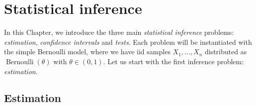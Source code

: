 \documentclass[
	fontsize=11pt, %
	twoside=false, %
	numbers=noenddot, %
]{kaobook}
\DeclareMathOperator{\ber}{Bernoulli}
\begin{document}
\mainmatter %




% 



\setchapterpreamble[u]{\margintoc}
\chapter{Statistical inference}
\label{chap:statistical_inference}

In this Chapter, we introduce the three main \emph{statistical inference} problems: \emph{estimation}, \emph{confidence intervals} and \emph{tests}.
Each problem will be instantiated with the simple Bernoulli model, where we have iid samples $X_1, \ldots, X_n$ distributed as $\ber(\theta)$ with $\theta \in (0, 1)$.
Let us start with the first inference problem: \emph{estimation}.

\section{Estimation} %
\label{sec:estimation}
\end{document}
